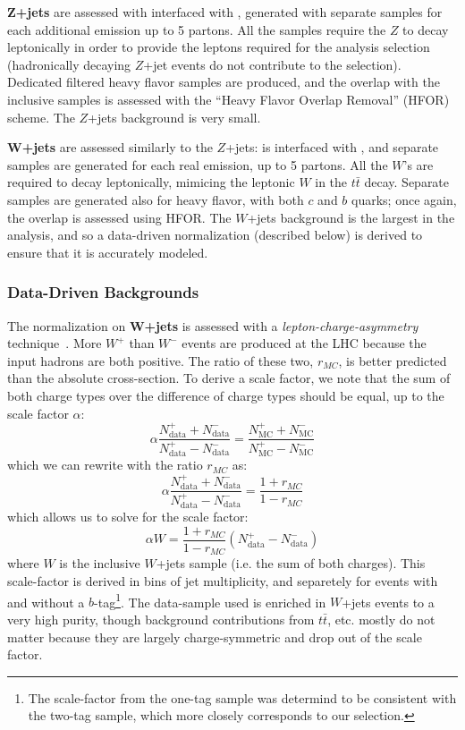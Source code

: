 \textbf{$\mathbf{Z}$+jets} are assessed with \Alpgen interfaced with \Pythia, generated with separate samples for each additional emission up to 5 partons. All the samples require the $Z$ to decay leptonically in order to provide the leptons required for the analysis selection (hadronically decaying $Z$+jet events do not contribute to the selection). Dedicated filtered heavy flavor samples are produced, and the overlap with the inclusive samples is assessed with the ``Heavy Flavor Overlap Removal'' (HFOR) scheme. The $Z$+jets background is very small.

\textbf{$\mathbf{W}$+jets} are assessed similarly to the $Z$+jets: \Alpgen is interfaced with \Pythia, and separate samples are generated for each real emission, up to 5 partons. All the $W$'s are required to decay leptonically, mimicing the leptonic $W$ in the $t\bar{t}$ decay. Separate samples are generated also for heavy flavor, with both $c$ and $b$ quarks; once again, the overlap is assessed using HFOR. The $W$+jets background is the largest in the analysis, and so a data-driven normalization (described below) is derived to ensure that it is accurately modeled. 


\subsubsection{Data-Driven Backgrounds}

The normalization on \textbf{$\mathbf{W}$+jets} is assessed with a \textit{lepton-charge-asymmetry} technique~\cite{wjetscharge}. More $W^+$ than $W^-$ events are produced at the LHC because the input hadrons are both positive. The ratio of these two, $r_{MC}$, is better predicted than the absolute cross-section. To derive a scale factor, we note that the sum of both charge types over the difference of charge types should be equal, up to the scale factor $\alpha$:
%
\begin{equation}
\alpha \frac{N_\mathrm{data}^+ + N_\mathrm{data}^-}{N_\mathrm{data}^+ - N_\mathrm{data}^-} = \frac{N_\mathrm{MC}^+ + N_\mathrm{MC}^-}{N_\mathrm{MC}^+ - N_\mathrm{MC}^-}
\end{equation}
% 
which we can rewrite with the ratio $r_{MC}$ as:
%
\begin{equation}
\alpha \frac{N_\mathrm{data}^+ + N_\mathrm{data}^-}{N_\mathrm{data}^+ - N_\mathrm{data}^-} = \frac{1 + r_{MC}}{1 - r_{MC}}
\end{equation}
%
which allows us to solve for the scale factor:
%
\begin{equation}
\alpha W = \frac{1 + r_{MC}}{1 - r_{MC}} \left( N_\mathrm{data}^+ - N_\mathrm{data}^- \right)
\end{equation}
%
where $W$ is the inclusive $W$+jets sample (i.e. the sum of both charges). This scale-factor is derived in bins of jet multiplicity, and separetely for events with and without a $b$-tag\footnote{The scale-factor from the one-tag sample was determind to be consistent with the two-tag sample, which more closely corresponds to our selection.}. The data-sample used is enriched in $W$+jets events to a very high purity, though background contributions from $t\bar{t}$, etc. mostly do not matter because they are largely charge-symmetric and drop out of the scale factor.

